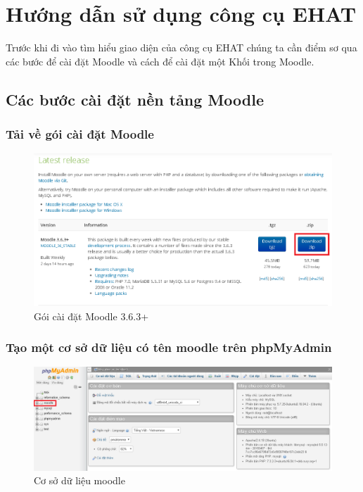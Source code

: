 \section{Hướng dẫn sử dụng công cụ EHAT}

Trước khi đi vào tìm hiểu giao diện của công cụ EHAT chúng ta cần điểm sơ qua các bước để cài đặt Moodle và cách để cài đặt một Khối trong Moodle.

\subsection{Các bước cài đặt nền tảng Moodle}

\subsubsection{Tải về gói cài đặt Moodle}

\begin{center}
	\begin{figure}[htp]
		\begin{center}
			\includegraphics[width=0.8\linewidth]{img/packagemoodle}
		\end{center}
		\caption{Gói cài đặt Moodle 3.6.3+}
		\label{refhinh28}
	\end{figure}
\end{center}

\subsubsection{Tạo một cơ sở dữ liệu có tên moodle trên phpMyAdmin}

\begin{center}
	\begin{figure}[htp]
		\begin{center}
			\includegraphics[width=1.3\linewidth]{img/dbmoodle}
		\end{center}
		\caption{Cơ sở dữ liệu moodle}
		\label{refhinh29}
	\end{figure}
\end{center}

